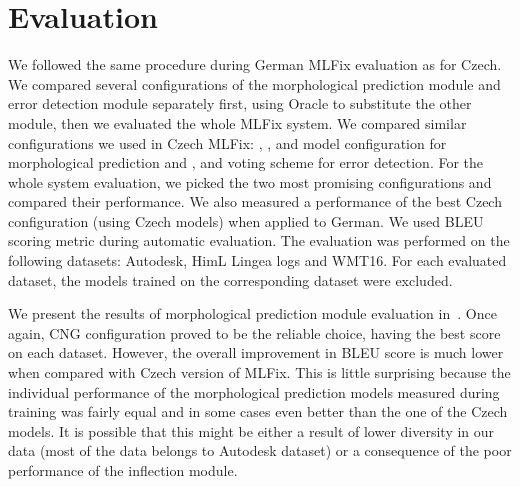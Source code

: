 \section{Evaluation}

We followed the same procedure during German MLFix evaluation as for
Czech. We compared several configurations of the morphological prediction
module and error detection module separately first, using Oracle to substitute the other
module, then we evaluated the whole MLFix system. We compared similar configurations
we used in Czech MLFix: , ,  and  model configuration for morphological
prediction and ,  and  voting scheme for error
detection. For the whole system evaluation, we picked the two most promising configurations
and compared their performance. We also measured a performance of the best Czech configuration
(using Czech models) when applied to German. We used BLEU scoring metric during automatic evaluation.
The evaluation was performed on the following datasets: Autodesk, HimL Lingea logs and WMT16.
For each evaluated dataset, the models trained on the corresponding dataset were excluded.

We present the results of morphological prediction module evaluation in~.
Once again, CNG configuration proved to be the reliable choice, having the best score on each dataset.
However, the overall improvement in BLEU score is much lower when compared with Czech version
of MLFix. This is little surprising because the individual performance of the morphological prediction
models measured during training was fairly equal and in some cases even better than the one of the Czech models.
It is possible that this might be either a result of lower diversity in our data (most of the data belongs
to Autodesk dataset) or a consequence of the poor performance of the inflection module.

